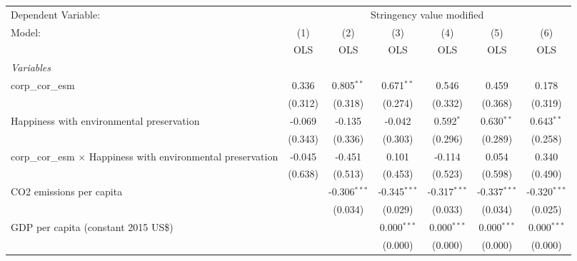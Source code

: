 
\begingroup
\centering
\begin{tabular}{lcccccc}
   \toprule
   Dependent Variable: & \multicolumn{6}{c}{Stringency value modified}\\
   Model:                                                               & (1)     & (2)            & (3)            & (4)            & (5)            & (6)\\  
                                                                        &  OLS    & OLS            & OLS            & OLS            & OLS            & OLS\\  
   \midrule
   \emph{Variables}\\
   corp\_cor\_esm                                                       & 0.336   & 0.805$^{**}$   & 0.671$^{**}$   & 0.546          & 0.459          & 0.178\\   
                                                                        & (0.312) & (0.318)        & (0.274)        & (0.332)        & (0.368)        & (0.319)\\   
   Happiness with environmental preservation                            & -0.069  & -0.135         & -0.042         & 0.592$^{*}$    & 0.630$^{**}$   & 0.643$^{**}$\\   
                                                                        & (0.343) & (0.336)        & (0.303)        & (0.296)        & (0.289)        & (0.258)\\   
   corp\_cor\_esm $\times$ Happiness with environmental preservation    & -0.045  & -0.451         & 0.101          & -0.114         & 0.054          & 0.340\\   
                                                                        & (0.638) & (0.513)        & (0.453)        & (0.523)        & (0.598)        & (0.490)\\   
   CO2 emissions per capita                                             &         & -0.306$^{***}$ & -0.345$^{***}$ & -0.317$^{***}$ & -0.337$^{***}$ & -0.320$^{***}$\\   
                                                                        &         & (0.034)        & (0.029)        & (0.033)        & (0.034)        & (0.025)\\   
   GDP per capita (constant 2015 US\$)                                  &         &                & 0.000$^{***}$  & 0.000$^{***}$  & 0.000$^{***}$  & 0.000$^{***}$\\   
                                                                        &         &                & (0.000)        & (0.000)        & (0.000)        & (0.000)\\   

\end{tabular}
